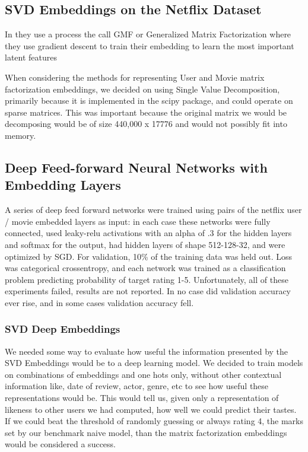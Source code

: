 \subsection{SVD Embeddings on the Netflix Dataset}

In \cite{He2017} they use a process the call GMF or Generalized Matrix Factorization where they use gradient descent to train their embedding to learn the most important latent features

When considering the methods for representing User and Movie matrix factorization embeddings, we decided on using Single Value Decomposition, primarily because it is implemented in the scipy package, and could operate on sparse matrices. This was important because the original matrix we would be decomposing would be of size 440,000 x 17776 and would not possibly fit into memory. 

\subsection{Deep Feed-forward Neural Networks with Embedding Layers}
A series of deep feed forward networks were trained using pairs of the netflix user / movie embedded layers as input: in each case these networks were fully connected, used leaky-relu activations with an alpha of .3 for the hidden layers and softmax for the output, had hidden layers of shape 512-128-32, and were optimized by SGD. For validation, 10\% of the training data was held out. Loss was categorical crossentropy, and each network was trained as a classification problem predicting probability of target rating 1-5. Unfortunately, all of these experiments failed, results are not reported. In no case did validation accuracy ever rise, and in some cases validation accuracy fell.

\subsubsection{SVD Deep Embeddings}
We needed some way to evaluate how useful the information presented by the SVD Embeddings would be to a deep learning model. We decided to train models on combinations of embeddings and one hots only, without other contextual information like, date of review, actor, genre, etc to see how useful these representations would be. This would tell us, given only a representation of likeness to other users we had computed, how well we could predict their tastes. If we could beat the threshold of randomly guessing or always rating 4, the marks set by our benchmark naive model, than the matrix factorization embeddings would be considered a success.

